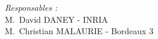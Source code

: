 \begin{titlepage}
\begin{center}
\begin{center}
                  \begin{center}
                    
                    
                    
                    
                  
                  
                  
                  
                  
  \end{center}    
\end{center}
\begin{flushbottom}
\begin{flushright} 
  \large
  \emph{Responsables :} \\
  M.~David DANEY - \small{INRIA} \\
  M.~Christian MALAURIE - \small{Bordeaux 3}
\end{flushright}
\end{flushbottom}
\end{center}
\end{titlepage}
